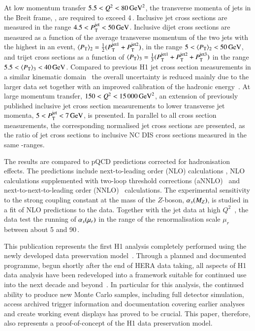 \documentclass[12pt]{article}
\begin{document}
At low momentum transfer $5.5<Q^2<80\,\GeVsq$, the transverse momenta of jets in the Breit frame, \ptjet, are required to exceed 4\,\GeV. 
Inclusive jet cross sections are measured in the range $4.5<\ptjet<50\,\GeV$. 
Inclusive dijet cross sections are measured as a function of the average transverse momentum of the two jets with the highest \ptjet in an event, $\meanptdi= \tfrac{1}{2}(P_{\rm T}^{\rm jet1} + P_{\rm T}^{\rm jet2} )  $,
in the range $5<\meanptdi<50\,\GeV$, and trijet cross sections as a function 
of $\meanpttri= \tfrac{1}{3}(P_{\rm T}^{\rm jet1} + P_{\rm T}^{\rm jet2}+ P_{\rm T}^{\rm jet3} )$ in the range $5.5<\meanpttri<40\,\GeV$.
Compared to previous H1 jet cross section measurements in a similar kinematic domain~\cite{H1_lowq2} 
the overall uncertainty is reduced mainly due to the larger data set together with an 
improved calibration of the hadronic energy~\cite{H1Multijets,ThesisKogler}.
At large momentum transfer,  $150<\Qsq<15\,000\,\GeVsq$, an extension of previously published inclusive jet cross section measurements \cite{H1Multijets} to 
  lower transverse jet momenta, $5<\ptjet<7\,\GeV$, is presented.
In parallel to all cross section measurements, the corresponding normalised jet cross sections are presented, as the ratio of jet cross sections to 
inclusive NC DIS cross sections measured in the same \Qsq-ranges. 

The results are compared to pQCD predictions corrected 
for hadronisation effects.
The predictions include next-to-leading order (NLO) calculations \cite{Nagy2,Nagy3}, 
NLO calculations supplemented with two-loop threshold corrections (aNNLO)~\cite{aNNLO,aNNLOprivate} and next-to-next-to-leading order (NNLO)~\cite{NNLO,NNLOprivate} calculations. 
The experimental sensitivity to the strong coupling constant at the mass of the $Z$-boson, $\asmz$, is studied in a fit of NLO predictions to the data.
Together with the jet data at high $Q^2$~\cite{H1Multijets}, the data test the running of $\asmur$ 
in the range of the renormalisation scale $\mu_r$ between about 5 and 90\,\GeV.

This publication represents the first H1 analysis completely performed using the newly developed data preservation model~\cite{Akopov:2012bm}. Through a planned and documented programme, begun shortly after the end of HERA data taking, all aspects of H1 data analysis have been redeveloped into a framework suitable for continued use into the next decade and beyond~\cite{Ozerov:2013isa,Amerio:2015ipk}. In particular for this analysis, the continued ability to produce new Monte Carlo samples, including full detector simulation, access archived trigger information and documentation covering earlier analyses and create working event displays has proved to be crucial. This paper, therefore, also represents a proof-of-concept of the H1 data preservation model. 
\end{document}
